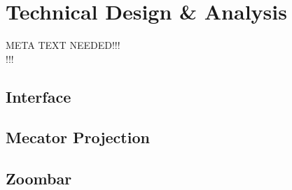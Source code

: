 \section{Technical Design \& Analysis}
META TEXT NEEDED!!!\\
!!!\\
\subsection{Interface}
\subsection{Mecator Projection}
\subsection{Zoombar}